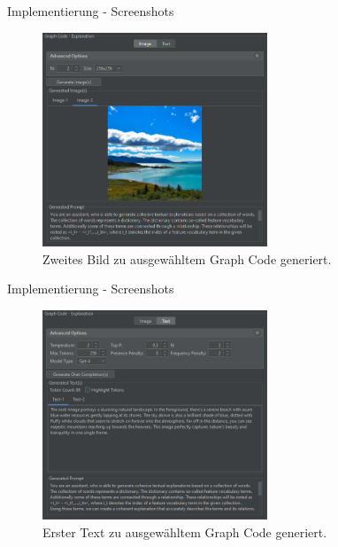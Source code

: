 \documentclass[t]{beamer}
\begin{document}
\begin{frame}{Implementierung - Screenshots}

  \begin{figure}
    \includegraphics[width=0.6\textwidth]{images/right_img_two_exps_2}
    \caption{Zweites Bild zu ausgewähltem Graph Code generiert.}
  \end{figure}

\end{frame}

\begin{frame}{Implementierung - Screenshots}

  \begin{figure}
    \includegraphics[width=0.6\textwidth]{images/right_text_two_exps_1}
    \caption{Erster Text zu ausgewähltem Graph Code generiert.}
  \end{figure}

\end{frame}
\end{document}
